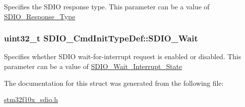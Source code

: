 \label{structSDIO__CmdInitTypeDef_aecb203e21321126d5f05c34787cacfd2}
Specifies the SDIO response type. This parameter can be a value of \hyperlink{group__SDIO__Response__Type}{SDIO\_\-Response\_\-Type} \hypertarget{structSDIO__CmdInitTypeDef_a582258554233ff8550bd04d2d790c67c}{
\subsubsection[{SDIO\_\-Wait}]{\setlength{\rightskip}{0pt plus 5cm}uint32\_\-t {\bf SDIO\_\-CmdInitTypeDef::SDIO\_\-Wait}}}
\label{structSDIO__CmdInitTypeDef_a582258554233ff8550bd04d2d790c67c}
Specifies whether SDIO wait-\/for-\/interrupt request is enabled or disabled. This parameter can be a value of \hyperlink{group__SDIO__Wait__Interrupt__State}{SDIO\_\-Wait\_\-Interrupt\_\-State} 

The documentation for this struct was generated from the following file:\begin{DoxyCompactItemize}
\item 
\hyperlink{stm32f10x__sdio_8h}{stm32f10x\_\-sdio.h}\end{DoxyCompactItemize}
